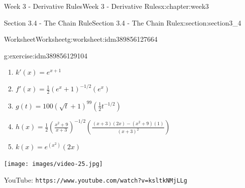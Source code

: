 \documentclass[oneside,10pt,]{book}
\newcommand{\mono}[1]{\texttt{#1}}
\numberwithin{equation}{section}
\newlength{\qrsize}
\newlength{\previewwidth}
\begin{document}
\begin{chapterptx}{Week 3 - Derivative Rules}{}{Week 3 - Derivative Rules}{}{}{x:chapter:week3}
\begin{sectionptx}{Section 3.4 - The Chain Rule}{}{Section 3.4 - The Chain Rule}{}{}{x:section:section3_4}
\begin{worksheet-subsection}{Worksheet}{}{Worksheet}{}{}{g:worksheet:idm389856127664}
\begin{divisionexercise}{1}{}{}{g:exercise:idm389856129104}
\begin{enumerate}[label=(\alph*)]
\item{}\(\displaystyle k'(x) = e^{x+1}\)%
\item{}\(\displaystyle f'(x) = \frac 12 (e^x +1)^{-1/2}(e^x)\)%
\item{}\(\displaystyle g(t) = 100(\sqrt{t} + 1)^{99}\left( \frac 12 t^{-1/2} \right)\)%
\item{}\(\displaystyle h(x) = \frac 12 \left( \frac{x^2+9}{x+3} \right) ^{-1/2} \left( \frac{(x+3)(2x)-(x^2+9)(1)}{(x+3)^2} \right)\)%
\item{}\(\displaystyle k(x) = e^{(x^2)} (2x)\)%
\end{enumerate}
\end{divisionexercise}%
\end{worksheet-subsection}
\restoregeometry
\setlength{\qrsize}{9em}
\setlength{\previewwidth}{\linewidth}
\addtolength{\previewwidth}{-\qrsize}
\begin{tcbraster}[raster columns=2, raster column skip=1pt, raster halign=center, raster force size=false, raster left skip=0pt, raster right skip=0pt]%
\begin{tcolorbox}[previewstyle, width=\previewwidth]%
\texttt{[image: images/video-25.jpg]}%
\end{tcolorbox}%
\begin{tcolorbox}[qrstyle]%
{\hypersetup{urlcolor=black}}%
\end{tcolorbox}%
\begin{tcolorbox}[captionstyle]%
\small YouTube: \mono{https://www.youtube.com/watch?v=ksltkNMjLLg}\end{tcolorbox}%
\end{tcbraster}%
\end{sectionptx}
\end{chapterptx}
%
%
\typeout{************************************************}
\typeout{************************************************}
%
\end{document}

